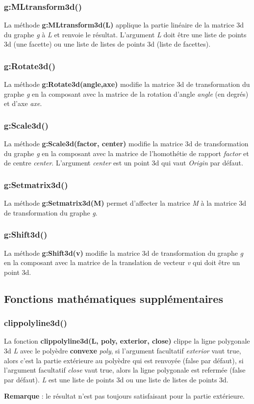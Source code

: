 \subsubsection{g:MLtransform3d()}
La méthode \textbf{g:MLtransform3d(L)} applique la partie linéaire de la matrice 3d du graphe \emph g à \emph{L} et renvoie le résultat. L'argument \emph L doit être une liste de points 3d (une facette) ou une liste de listes de points 3d (liste de facettes).

\subsubsection{g:Rotate3d()}
La méthode \textbf{g:Rotate3d(angle,axe)} modifie la matrice 3d de transformation du graphe \emph g en la composant avec la matrice de la rotation d'angle \emph{angle} (en degrés) et d'axe \emph{axe}. 

\subsubsection{g:Scale3d()}
La méthode \textbf{g:Scale3d(factor, center)} modifie la matrice 3d de transformation du graphe \emph g en la composant avec la matrice de l'homothétie de rapport \emph{factor} et de centre \emph{center}. L'argument \emph{center} est un point 3d qui vaut \emph{Origin} par défaut.


\subsubsection{g:Setmatrix3d()}
La méthode \textbf{g:Setmatrix3d(M)} permet d'affecter la matrice \emph M à la matrice 3d de transformation du graphe \emph g.

\subsubsection{g:Shift3d()}
La méthode \textbf{g:Shift3d(v)} modifie la matrice 3d de transformation du graphe \emph g en la composant avec la matrice de la translation de vecteur \emph{v} qui doit être un point 3d.

\subsection{Fonctions mathématiques supplémentaires}

\subsubsection{clippolyline3d()}
La fonction \textbf{clippolyline3d(L, poly, exterior, close)} clippe la ligne polygonale 3d \emph{L} avec le polyèdre \textbf{convexe} \emph{poly}, si l'argument facultatif \emph{exterior} vaut true, alors c'est la partie extérieure au polyèdre qui est renvoyée (false par défaut), si l'argument facultatif \emph{close} vaut true, alors la ligne polygonale est refermée (false par défaut). \emph{L} est une liste de points 3d ou une liste de listes de points 3d.\par
\textbf{Remarque} : le résultat n'est pas toujours satisfaisant pour la partie extérieure.

